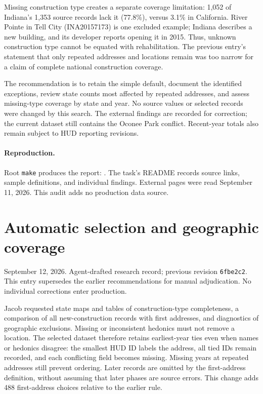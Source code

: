 \documentclass[11pt]{article}
\begin{document}
Missing construction type creates a separate coverage limitation: 1,052 of
Indiana's 1,353 source records lack it (77.8\%), versus 3.1\% in California.
River Pointe in Tell City (INA20157173) is one excluded example; Indiana
describes a new building, and its developer reports opening it in 2015. Thus,
unknown construction type cannot be equated with rehabilitation. The previous
entry's statement that only repeated addresses and locations remain was too
narrow for a claim of complete national construction coverage.

The recommendation is to retain the simple default, document the identified
exceptions, review state counts most affected by repeated addresses, and assess
missing-type coverage by state and year. No source values or selected records
were changed by this search. The external findings are recorded for correction;
the current dataset still contains the Oconee Park conflict. Recent-year totals
also remain subject to HUD reporting revisions.

\paragraph{Reproduction.} Root \texttt{make} produces the report:
\newline
{}.\newline
The task's README
records source links, sample definitions, and individual findings. External
pages were read September 11, 2026. This audit adds no production data source.
\clearpage
\section*{Automatic selection and geographic coverage}
\noindent September 12, 2026. Agent-drafted research record; previous revision
\texttt{6fbe2c2}. This entry supersedes the earlier recommendations for manual
adjudication. No individual corrections enter production.

Jacob requested state maps and tables of construction-type completeness, a
comparison of all new-construction records with first addresses, and diagnostics
of geographic exclusions. Missing or inconsistent hedonics must not remove a
location. The selected dataset therefore retains earliest-year ties even when
names or hedonics disagree: the smallest HUD ID labels the address, all tied IDs
remain recorded, and each conflicting field becomes missing. Missing years at
repeated addresses still prevent ordering. Later records are omitted by the
first-address definition, without assuming that later phases are source errors.
This change adds 488 first-address choices relative to the earlier rule.
\end{document}
